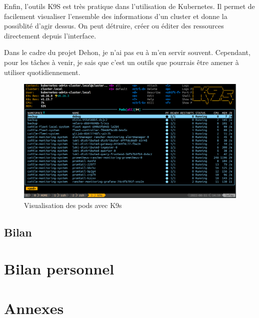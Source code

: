 \documentclass[12pt]{article}
\begin{document}
Enfin, l'outils K9S est très pratique dans l'utilisation de Kubernetes.
Il permet de facilement visualiser l'ensemble des informations d'un cluster et donne la possiblité d'agir dessus.
On peut détruire, créer ou éditer des ressources directement depuis l'interface.

Dans le cadre du projet Dehon, je n'ai pas eu à m'en servir souvent.
Cependant, pour les tâches à venir, je sais que c'est un outils que pourrais être amener à utiliser quotidiennement.

\begin{figure}[!ht]
    \centering
        \includegraphics[width=\textwidth]{src/k9s.png}
    \caption{Visualisation des pods avec K9s}
    \label{fig:k9s}
\end{figure}


\newpage
\subsection{Bilan}

\newpage
\section{Bilan personnel}


\newpage
\section{Annexes}
\end{document}
